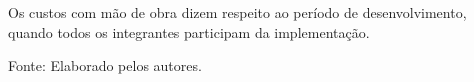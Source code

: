 \documentclass[
    12pt,               %
    openright,          %
    oneside,
    a4paper,            %
    BIBLATEX,           %
    TODO,               %
    english,            %
    brazil              %
    ]{ifsp-spo-inf-ctds}
\begin{document}
            Os custos com mão de obra dizem respeito ao período de desenvolvimento, quando todos os integrantes participam da implementação.

            \begin{table}[h]
                \centering
                 \caption{Custos de mão de obra mensal. Em R\$}
               
                \label{tab:custos-maodeobra}
                \centering
                \footnotesize Fonte: Elaborado pelos autores.
            \end{table} 

            
            
\end{document}
